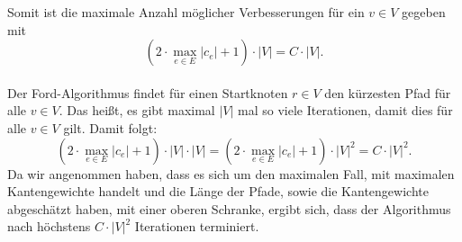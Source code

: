 \documentclass{scrartcl} %
\begin{document}
\begin{aufgabe}
        Somit ist die maximale Anzahl möglicher Verbesserungen für ein $v \in V$ gegeben mit $$(2\cdot \underset{e \in E}{\max}|c_e|+1) \cdot |V| = C \cdot |V|.$$  \\
        Der Ford-Algorithmus findet für einen Startknoten $r \in V$ den kürzesten Pfad für alle $v \in V$. Das heißt, es gibt maximal $|V|$ mal so viele Iterationen, damit dies für alle $v \in V$ gilt. Damit folgt: $$ (2\cdot \underset{e \in E}{\max}|c_e|+1) \cdot |V| \cdot |V| = (2\cdot \underset{e \in E}{\max}|c_e|+1) \cdot |V|^2 = C \cdot |V|^2.$$ Da wir angenommen haben, dass es sich um den maximalen Fall, mit maximalen Kantengewichte handelt und die Länge der Pfade, sowie die Kantengewichte abgeschätzt haben, mit einer oberen Schranke, ergibt sich, dass der Algorithmus nach höchstens $C \cdot |V|^2$ Iterationen terminiert. 
    \end{aufgabe}
\end{document}
